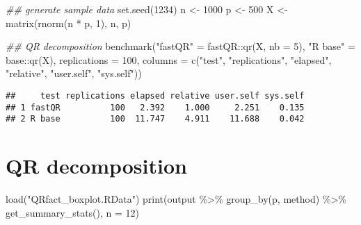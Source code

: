 \documentclass[]{tufte-handout}
\newenvironment{Shaded}{}{}
\newcommand{\AttributeTok}[1]{\textcolor[rgb]{0.49,0.56,0.16}{#1}}
\newcommand{\DecValTok}[1]{\textcolor[rgb]{0.25,0.63,0.44}{#1}}
\newcommand{\DocumentationTok}[1]{\textcolor[rgb]{0.73,0.13,0.13}{\textit{#1}}}
\newcommand{\FunctionTok}[1]{\textcolor[rgb]{0.02,0.16,0.49}{#1}}
\newcommand{\NormalTok}[1]{#1}
\newcommand{\OtherTok}[1]{\textcolor[rgb]{0.00,0.44,0.13}{#1}}
\newcommand{\SpecialCharTok}[1]{\textcolor[rgb]{0.25,0.44,0.63}{#1}}
\newcommand{\StringTok}[1]{\textcolor[rgb]{0.25,0.44,0.63}{#1}}
\begin{document}
\begin{Shaded}
\begin{Highlighting}[]
\DocumentationTok{\#\# generate sample data}
\FunctionTok{set.seed}\NormalTok{(}\DecValTok{1234}\NormalTok{)}
\NormalTok{n }\OtherTok{\textless{}{-}} \DecValTok{1000}
\NormalTok{p }\OtherTok{\textless{}{-}} \DecValTok{500}
\NormalTok{X }\OtherTok{\textless{}{-}} \FunctionTok{matrix}\NormalTok{(}\FunctionTok{rnorm}\NormalTok{(n }\SpecialCharTok{*}\NormalTok{ p, }\DecValTok{1}\NormalTok{), n, p)}

\DocumentationTok{\#\# QR decomposition}
\FunctionTok{benchmark}\NormalTok{(}\StringTok{"fastQR"} \OtherTok{=}\NormalTok{ fastQR}\SpecialCharTok{::}\FunctionTok{qr}\NormalTok{(X, }\AttributeTok{nb =} \DecValTok{5}\NormalTok{),}
          \StringTok{"R base"} \OtherTok{=}\NormalTok{ base}\SpecialCharTok{::}\FunctionTok{qr}\NormalTok{(X),}
          \AttributeTok{replications =} \DecValTok{100}\NormalTok{,}
          \AttributeTok{columns =} \FunctionTok{c}\NormalTok{(}\StringTok{"test"}\NormalTok{, }\StringTok{"replications"}\NormalTok{, }\StringTok{"elapsed"}\NormalTok{,}
                      \StringTok{"relative"}\NormalTok{, }\StringTok{"user.self"}\NormalTok{, }\StringTok{"sys.self"}\NormalTok{))}
\end{Highlighting}
\end{Shaded}

\begin{verbatim}
##     test replications elapsed relative user.self sys.self
## 1 fastQR          100   2.392    1.000     2.251    0.135
## 2 R base          100  11.747    4.911    11.688    0.042
\end{verbatim}

\hypertarget{qr-decomposition}{%
\section{QR decomposition}\label{qr-decomposition}}

\begin{Shaded}
\begin{Highlighting}[]
\FunctionTok{load}\NormalTok{(}\StringTok{"QRfact\_boxplot.RData"}\NormalTok{)}
\FunctionTok{print}\NormalTok{(output }\SpecialCharTok{\%\textgreater{}\%}
        \FunctionTok{group\_by}\NormalTok{(p, method) }\SpecialCharTok{\%\textgreater{}\%}
        \FunctionTok{get\_summary\_stats}\NormalTok{(), }\AttributeTok{n =} \DecValTok{12}\NormalTok{)}
\end{Highlighting}
\end{Shaded}
\end{document}
